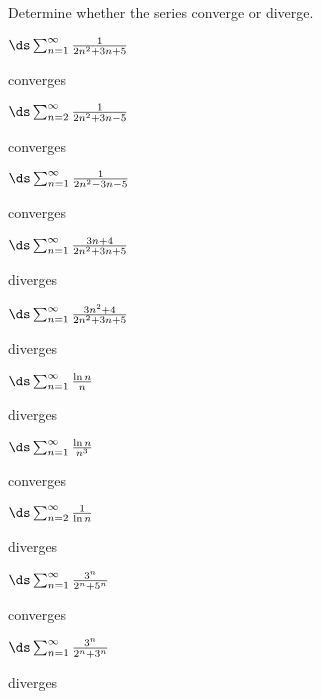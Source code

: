 \begin{enumialphparenastyle}

Determine whether the series converge or diverge.

\begin{multicols}{2}
\begin{ex}
$\ds\sum_{n=1}^\infty {1\over 2n^2+3n+5} $
\begin{sol}
converges
\end{sol}
\end{ex}

\begin{ex}
$\ds\sum_{n=2}^\infty {1\over 2n^2+3n-5} $
\begin{sol}
converges
\end{sol}
\end{ex}

\begin{ex}
$\ds\sum_{n=1}^\infty {1\over 2n^2-3n-5} $
\begin{sol}
converges
\end{sol}
\end{ex}

\begin{ex}
$\ds\sum_{n=1}^\infty {3n+4\over 2n^2+3n+5} $
\begin{sol}
diverges
\end{sol}
\end{ex}

\begin{ex}
$\ds\sum_{n=1}^\infty {3n^2+4\over 2n^2+3n+5} $
\begin{sol}
diverges
\end{sol}
\end{ex}

\begin{ex}
$\ds\sum_{n=1}^\infty {\ln n\over n}$
\begin{sol}
diverges
\end{sol}
\end{ex}

\begin{ex}
$\ds\sum_{n=1}^\infty {\ln n\over n^3}$
\begin{sol}
converges
\end{sol}
\end{ex}

\begin{ex}
$\ds\sum_{n=2}^\infty {1\over \ln n}$
\begin{sol}
diverges
\end{sol}
\end{ex}

\begin{ex}
$\ds\sum_{n=1}^\infty {3^n\over 2^n+5^n}$
\begin{sol}
converges
\end{sol}
\end{ex}

\begin{ex}
$\ds\sum_{n=1}^\infty {3^n\over 2^n+3^n}$
\begin{sol}
diverges
\end{sol}
\end{ex}
\end{multicols}

\end{enumialphparenastyle}